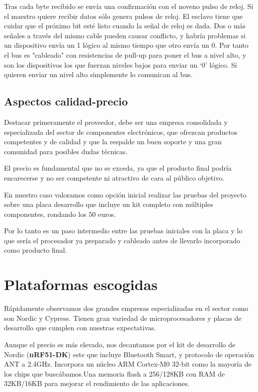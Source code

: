 Tras cada byte recibido se envía una confirmación con el noveno pulso de reloj. Si el maestro quiere recibir datos sólo genera pulsos de reloj. El esclavo tiene que cuidar que el próximo bit esté listo cuando la señal de reloj es dada. Dos o más señales a través del mismo cable pueden causar conflicto, y habría problemas si un dispositivo envía un 1 lógico al mismo tiempo que otro envía un 0. Por tanto el bus es "cableado" con resistencias de pull-up para poner el bus a nivel alto, y son los dispositivos los que fuerzan niveles bajos para enviar un ‘0’ lógico. Si quieren enviar un nivel alto simplemente lo comunican al bus.

\subsection{Aspectos calidad-precio}
\label{makereference3.3.2}

Destacar primeramente el proveedor, debe ser una empresa consolidada y especializada del sector de componentes electrónicos, que ofrezcan productos competentes y de calidad y que la respalde un buen soporte y una gran comunidad para posibles dudas técnicas.

El precio es fundamental que no se exceda, ya que el producto final podría encarecerse y no ser competente ni atractivo de cara al público objetivo.

En nuestro caso valoramos como opción inicial realizar las pruebas del proyecto sobre una placa desarrollo que incluye un kit completo con múltiples componentes, rondando los 50 euros. 

Por lo tanto es un paso intermedio entre las pruebas iniciales con la placa y lo que sería el procesador ya preparado y cableado antes de llevarlo incorporado como producto final.

\section{Plataformas escogidas}
\label{makereference3.4}

Rápidamente observamos dos grandes empresas especializadas en el sector como son Nordic y Cypress. Tienen gran variedad de microprocesadores y placas de desarrollo que cumplen con nuestras expectativas.

Aunque el precio es más elevado, nos decantamos por el kit de desarrollo de Nordic (\textbf{nRF51-DK}) este que incluye Bluetooth Smart, y protocolo de operación  ANT a 2.4GHz. Incorpora un núcleo ARM Cortex-M0 32-bit  como la mayoría de los chips que buscábamos.Una memoria flash a 256/128KB con RAM de 32KB/16KB para mejorar el rendimiento de las aplicaciones.

